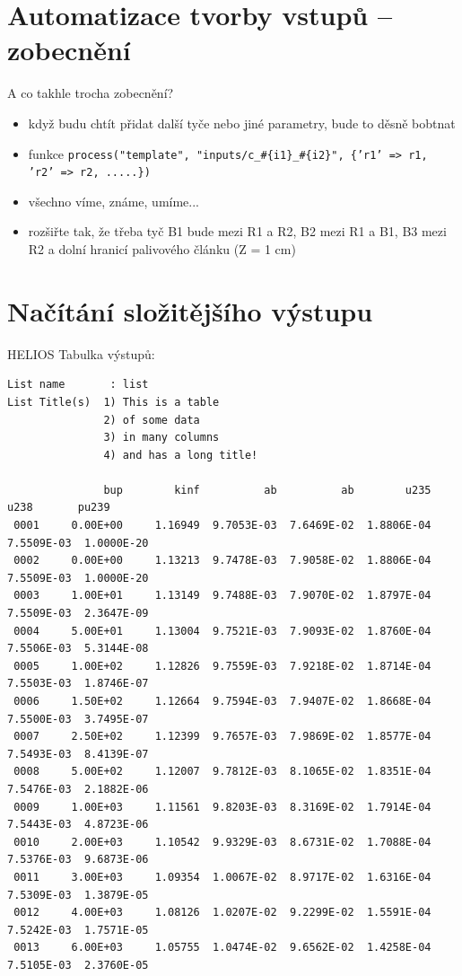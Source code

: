 \documentclass{beamer}
\begin{document}
\section{Automatizace tvorby vstupů -- zobecnění}

\begin{frame}{A co takhle trocha zobecnění?}
  \begin{itemize}
    \item když budu chtít přidat další tyče nebo jiné parametry, bude to děsně bobtnat
    \item funkce \texttt{process("template", "inputs/c\_\#\{i1\}\_\#\{i2\}", \{'r1' => r1, 'r2' => r2, .....\})}
    \item všechno víme, známe, umíme...
    \item rozšiřte tak, že třeba tyč B1 bude mezi R1 a R2, B2 mezi R1 a B1, B3 mezi R2 a dolní hranicí palivového článku (Z = 1 cm)
  \end{itemize}
\end{frame}

\section{Načítání složitějšího výstupu}

\begin{frame}[fragile]{HELIOS}
  Tabulka výstupů:
  \scriptsize
  \begin{verbatim}
List name       : list
List Title(s)  1) This is a table
               2) of some data
               3) in many columns
               4) and has a long title!

               bup        kinf          ab          ab        u235        u238       pu239
 0001     0.00E+00     1.16949  9.7053E-03  7.6469E-02  1.8806E-04  7.5509E-03  1.0000E-20
 0002     0.00E+00     1.13213  9.7478E-03  7.9058E-02  1.8806E-04  7.5509E-03  1.0000E-20
 0003     1.00E+01     1.13149  9.7488E-03  7.9070E-02  1.8797E-04  7.5509E-03  2.3647E-09
 0004     5.00E+01     1.13004  9.7521E-03  7.9093E-02  1.8760E-04  7.5506E-03  5.3144E-08
 0005     1.00E+02     1.12826  9.7559E-03  7.9218E-02  1.8714E-04  7.5503E-03  1.8746E-07
 0006     1.50E+02     1.12664  9.7594E-03  7.9407E-02  1.8668E-04  7.5500E-03  3.7495E-07
 0007     2.50E+02     1.12399  9.7657E-03  7.9869E-02  1.8577E-04  7.5493E-03  8.4139E-07
 0008     5.00E+02     1.12007  9.7812E-03  8.1065E-02  1.8351E-04  7.5476E-03  2.1882E-06
 0009     1.00E+03     1.11561  9.8203E-03  8.3169E-02  1.7914E-04  7.5443E-03  4.8723E-06
 0010     2.00E+03     1.10542  9.9329E-03  8.6731E-02  1.7088E-04  7.5376E-03  9.6873E-06
 0011     3.00E+03     1.09354  1.0067E-02  8.9717E-02  1.6316E-04  7.5309E-03  1.3879E-05
 0012     4.00E+03     1.08126  1.0207E-02  9.2299E-02  1.5591E-04  7.5242E-03  1.7571E-05
 0013     6.00E+03     1.05755  1.0474E-02  9.6562E-02  1.4258E-04  7.5105E-03  2.3760E-05
  \end{verbatim}
\end{frame}
\end{document}

